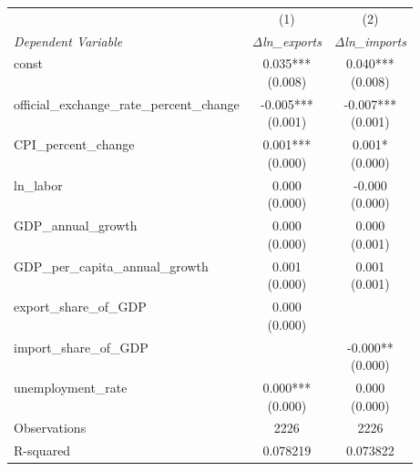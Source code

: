 \begin{tabular}{lcc}
\toprule
 & (1) & (2) \\
\textit{Dependent Variable} & \textit{Δln\_exports} & \textit{Δln\_imports} \\ 
\midrule

const & \makecell{0.035*** \\ (0.008)} & \makecell{0.040*** \\ (0.008)} \\
official\_exchange\_rate\_percent\_change & \makecell{-0.005*** \\ (0.001)} & \makecell{-0.007*** \\ (0.001)} \\
CPI\_percent\_change & \makecell{0.001*** \\ (0.000)} & \makecell{0.001* \\ (0.000)} \\
ln\_labor & \makecell{0.000 \\ (0.000)} & \makecell{-0.000 \\ (0.000)} \\
GDP\_annual\_growth & \makecell{0.000 \\ (0.000)} & \makecell{0.000 \\ (0.001)} \\
GDP\_per\_capita\_annual\_growth & \makecell{0.001 \\ (0.000)} & \makecell{0.001 \\ (0.001)} \\
export\_share\_of\_GDP & \makecell{0.000 \\ (0.000)} &  \\
import\_share\_of\_GDP &  & \makecell{-0.000** \\ (0.000)} \\
unemployment\_rate & \makecell{0.000*** \\ (0.000)} & \makecell{0.000 \\ (0.000)} \\
Observations & 2226 & 2226 \\
R-squared & 0.078219 & 0.073822 \\
\bottomrule
\end{tabular}

